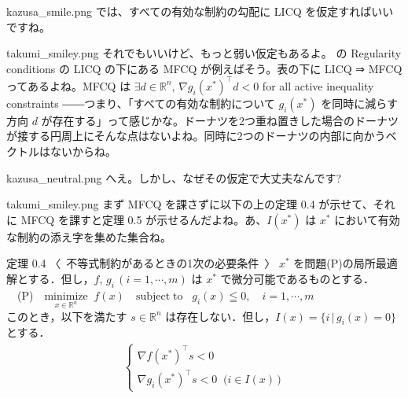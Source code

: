 \documentclass[b5paper,xelatex,ja=standard,10pt]{bxjsarticle}
\begin{document}
\begin{SERIFU}[colback=PaleIris, colbacktitle=PaleIris2]{kazusa_smile.png}
では、すべての有効な制約の勾配に LICQ を仮定すればいいですね。
\end{SERIFU}

\begin{SERIFU}[colback=PaleGold, colbacktitle=PaleGold2]{takumi_smiley.png}
それでもいいけど、もっと弱い仮定もあるよ。\cite{wikipedia_en} の Regularity conditions の LICQ の下にある MFCQ が例えばそう。表の下に LICQ ⇒ MFCQ ってあるよね。MFCQ は $\exists d \in \mathbb{R}^n, \, \nabla g_i(x^\ast) ^\top d < 0$ for all active inequality constraints ――つまり、「すべての有効な制約について $g_i(x^\ast)$ を同時に減らす方向 $d$ が存在する」って感じかな。ドーナツを2つ重ね置きした場合のドーナツが接する円周上にそんな点はないよね。同時に2つのドーナツの内部に向かうベクトルはないからね。
\end{SERIFU}

\begin{SERIFU}[colback=PaleIris, colbacktitle=PaleIris2]{kazusa_neutral.png}
へえ。しかし、なぜその仮定で大丈夫なんです?
\end{SERIFU}

\begin{SERIFU}[colback=PaleGold, colbacktitle=PaleGold2]{takumi_smiley.png}
まず MFCQ を課さずに以下の上の定理 0.4 が示せて、それに MFCQ を課すと定理 0.5 が示せるんだよね。あ、$I(x^\ast)$ は $x^\ast$ において有効な制約の添え字を集めた集合ね。
\end{SERIFU}

\begin{PROP}[colback=White]{定理 0.4 〈\, 不等式制約があるときの1次の必要条件 \,〉}
$x^\ast$ を問題(P)の局所最適解とする．但し，$f, \, g_i \, (i = 1, \cdots, m)$ は $x^\ast$ で微分可能であるものとする．
\\[3pt]
　(P)　$\displaystyle \underset{x \in \mathbb{R}^n}{\mathrm{minimize}} \; \; f(x)  \quad  \mathrm{subject \; to}   \; \; \; g_i(x) \leqq 0,  \quad i = 1, \cdots, m $
\\[3pt]
このとき，以下を満たす $s \in \mathbb{R}^n$ は存在しない．但し，$I(x) = \{i \, | \, g_i(x) = 0\}$ とする．
\begin{eqnarray*}
\left\{
\begin{array}{l}
\displaystyle \nabla f (x^\ast) ^\top s < 0  \\[5pt]
\nabla g_i (x^\ast) ^\top s < 0  \; \; \bigl(i \in I(x) \, \bigr)
\end{array}
\right.
\end{eqnarray*}
\end{PROP}
\end{document}
